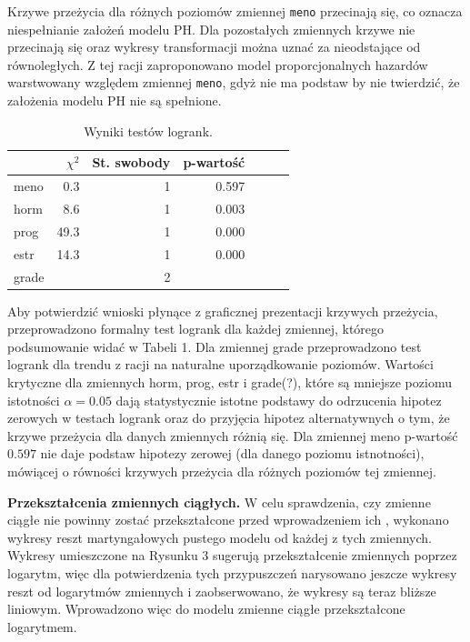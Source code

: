 \documentclass[]{article}
\begin{document}
Krzywe przeżycia dla różnych poziomów zmiennej \texttt{meno} przecinają
się, co oznacza niespełnianie założeń modelu PH. Dla pozostałych
zmiennych krzywe nie przecinają się oraz wykresy transformacji można
uznać za nieodstające od równoległych. Z tej racji zaproponowano model
proporcjonalnych hazardów warstwowany względem zmiennej \texttt{meno},
gdyż nie ma podstaw by nie twierdzić, że założenia modelu PH nie są
spełnione.

\begin{table}
\vspace{-20pt}
\caption{ Wyniki testów logrank. }
\begin{tabular}{lrrrrrr}
\toprule%
\ &$\chi^2$&St. swobody&p-wartość\\ \toprule meno&0.3&1&0.597\\ horm&8.6&1&0.003\\ prog&49.3&1&0.000\\ estr&14.3&1&0.000\\ grade&&2&\\  \bottomrule
\end{tabular}
\vspace{-7.5pt}
\end{table}

Aby potwierdzić wnioski płynące z graficznej prezentacji krzywych
przeżycia, przeprowadzono formalny test logrank dla każdej zmiennej,
którego podsumowanie widać w Tabeli 1. Dla zmiennej \textsf{grade}
przeprowadzono test logrank dla trendu z racji na naturalne
uporządkowanie poziomów. Wartości krytyczne dla zmiennych \textsf{horm},
\textsf{prog}, \textsf{estr} i \textsf{grade}(?), które są mniejsze
 poziomu istotności $\alpha=0.05$ dają
statystycznie istotne podstawy do odrzucenia hipotez zerowych w testach
logrank oraz do przyjęcia hipotez alternatywnych o tym, że krzywe
przeżycia dla danych zmiennych różnią się. Dla zmiennej \textsf{meno}
p-wartość $0.597$ nie daje podstaw  hipotezy zerowej
(dla danego poziomu istnotności), mówiącej o równości krzywych przeżycia
dla różnych poziomów tej zmiennej.

\newpage
\textbf{Przekształcenia zmiennych ciągłych.} \newline
W celu sprawdzenia, czy zmienne ciągłe nie powinny zostać przekształcone
przed wprowadzeniem ich , wykonano wykresy reszt
martyngałowych pustego modelu od każdej z tych zmiennych. Wykresy
umieszczone na Rysunku 3 sugerują przekształcenie zmiennych poprzez
logarytm, więc dla potwierdzenia tych przypuszczeń narysowano jeszcze
wykresy reszt od logarytmów zmiennych i zaobserwowano, że wykresy są
teraz bliższe liniowym. Wprowadzono więc do modelu zmienne ciągłe
przekształcone logarytmem.
\end{document}
